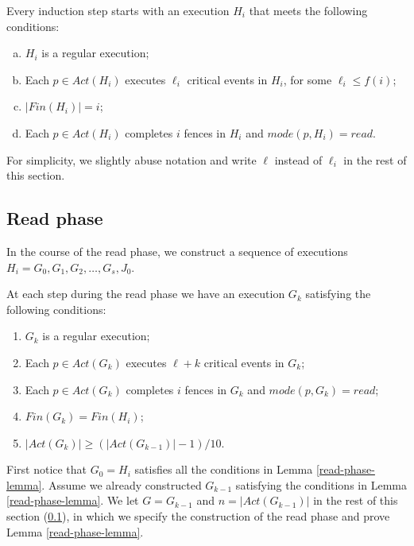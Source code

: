 Every induction step starts with an execution $H_i$ that meets the following conditions:

\begin{enumerate}[(a)]
	\item $H_i$ is a regular execution;
	\item Each $p \in Act(H_i)$ executes $\ell_i$ critical events in $H_i$, for some $\ell_i \leq f(i)$;
	\item $|Fin(H_i)| = i$;
	\item Each $p \in Act(H_i)$ completes $i$ fences in $H_i$ and $mode(p,H_i) = read$.
\end{enumerate}

For simplicity, we slightly abuse notation and write $\ell$ instead of $\ell_i$ in the rest of this section.




\subsection{Read phase}
\label{subsec:read-phase}
In the course of the read phase, we construct a sequence of executions $H_i=G_0,G_1,G_2,\ldots,G_s, J_0$.

\begin{lemma} \label{read-phase-lemma}
	At each step during the read phase we have an execution $G_k$ satisfying the following conditions:
	\begin{enumerate}[(1)]
		\item $G_k$ is a regular execution;
		\item Each $p \in Act(G_k)$ executes $\ell+k$ critical events in $G_k$;
		\item Each $p \in Act(G_k)$ completes $i$ fences in $G_k$ and $mode(p,G_k) = read$;
		\item $Fin(G_k) = Fin(H_i)$;
		\item $|Act(G_k)| \geq (|Act(G_{k-1})|-1)/10$.
	\end{enumerate}
\end{lemma}

\vspace{3mm} First notice that $G_0 = H_i$ satisfies all the conditions in Lemma \ref{read-phase-lemma}. Assume we already constructed $G_{k-1}$ satisfying the conditions in Lemma \ref{read-phase-lemma}. We let $G=G_{k-1}$ and $n=|Act(G_{k-1})|$ in the rest of this section (\ref{subsec:read-phase}), in which we specify the construction of the read phase and prove Lemma \ref{read-phase-lemma}.

